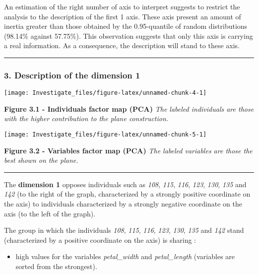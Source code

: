 \documentclass[]{article}
\providecommand{\tightlist}{%
  \setlength{\itemsep}{0pt}\setlength{\parskip}{0pt}}
\begin{document}
An estimation of the right number of axis to interpret suggests to
restrict the analysis to the description of the first 1 axis. These axis
present an amount of inertia greater than those obtained by the
0.95-quantile of random distributions (98.14\% against 57.75\%). This
observation suggests that only this axis is carrying a real information.
As a consequence, the description will stand to these axis.

\begin{center}\rule{0.5\linewidth}{\linethickness}\end{center}

\subsubsection{3. Description of the dimension
1}\label{description-of-the-dimension-1}

\begin{center}\texttt{[image: Investigate\_files/figure-latex/unnamed-chunk-4-1]} \end{center}

\textbf{Figure 3.1 - Individuals factor map (PCA)} \emph{The labeled
individuals are those with the higher contribution to the plane
construction.}

\begin{center}\texttt{[image: Investigate\_files/figure-latex/unnamed-chunk-5-1]} \end{center}

\textbf{Figure 3.2 - Variables factor map (PCA)} \emph{The labeled
variables are those the best shown on the plane.}

\begin{center}\rule{0.5\linewidth}{\linethickness}\end{center}

The \textbf{dimension 1} opposes individuals such as \emph{108},
\emph{115}, \emph{116}, \emph{123}, \emph{130}, \emph{135} and
\emph{142} (to the right of the graph, characterized by a strongly
positive coordinate on the axis) to individuals characterized by a
strongly negative coordinate on the axis (to the left of the graph).

The group in which the individuals \emph{108}, \emph{115}, \emph{116},
\emph{123}, \emph{130}, \emph{135} and \emph{142} stand (characterized
by a positive coordinate on the axis) is sharing :

\begin{itemize}
\tightlist
\item
  high values for the variables \emph{petal\_width} and
  \emph{petal\_length} (variables are sorted from the strongest).
\end{itemize}
\end{document}

